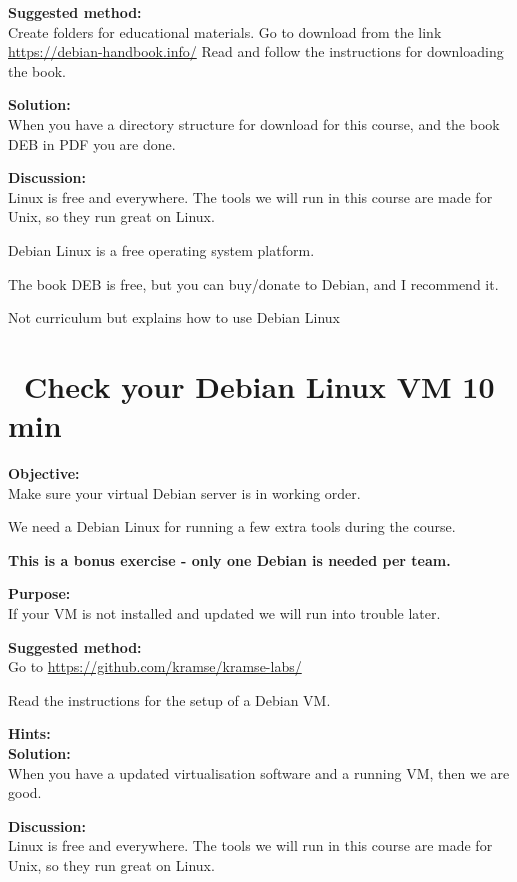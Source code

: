 \documentclass[a4paper,11pt,notitlepage]{report}
\begin{document}
{\bf Suggested method:}\\
Create folders for educational materials. Go to download from the link \url{https://debian-handbook.info/}
Read and follow the instructions for downloading the book.

{\bf Solution:}\\
When you have a directory structure for download for this course, and the book DEB in PDF you are done.

{\bf Discussion:}\\
Linux is free and everywhere. The tools we will run in this course are made for Unix, so they run great on Linux.

Debian Linux is a free operating system platform.

The book DEB is free, but you can buy/donate to Debian, and I recommend it.

Not curriculum but explains how to use Debian Linux

\chapter{\faExclamationTriangle\ Check your Debian Linux VM 10 min}
\label{ex:sw-basicDebianVM}


{\bf Objective:}\\
Make sure your virtual Debian server is in working order.

We need a Debian Linux for running a few extra tools during the course.

{\Large \bf This is a bonus exercise - only one Debian is needed per team.}

{\bf Purpose:}\\
If your VM is not installed and updated we will run into trouble later.

{\bf Suggested method:}\\
Go to \url{https://github.com/kramse/kramse-labs/}

Read the instructions for the setup of a Debian VM.

{\bf Hints:}\\

{\bf Solution:}\\
When you have a updated virtualisation software and a running VM, then we are good.

{\bf Discussion:}\\
Linux is free and everywhere. The tools we will run in this course are made for Unix, so they run great on Linux.
\end{document}
